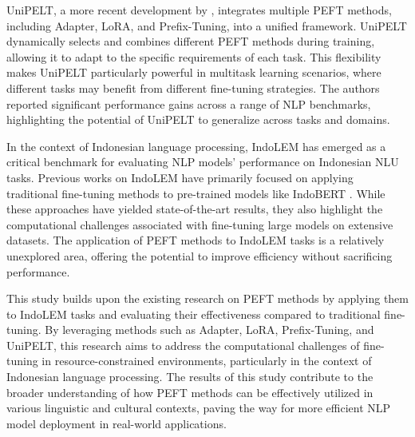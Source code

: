 UniPELT, a more recent development by \citeauthor{unipelt} \cite{unipelt}, integrates multiple PEFT methods, including Adapter, LoRA, and Prefix-Tuning, into a unified framework. UniPELT dynamically selects and combines different PEFT methods during training, allowing it to adapt to the specific requirements of each task. This flexibility makes UniPELT particularly powerful in multitask learning scenarios, where different tasks may benefit from different fine-tuning strategies. The authors reported significant performance gains across a range of NLP benchmarks, highlighting the potential of UniPELT to generalize across tasks and domains.

In the context of Indonesian language processing, IndoLEM \cite{indolem} has emerged as a critical benchmark for evaluating NLP models' performance on Indonesian NLU tasks. Previous works on IndoLEM have primarily focused on applying traditional fine-tuning methods to pre-trained models like IndoBERT \cite{indolem}. While these approaches have yielded state-of-the-art results, they also highlight the computational challenges associated with fine-tuning large models on extensive datasets. The application of PEFT methods to IndoLEM tasks is a relatively unexplored area, offering the potential to improve efficiency without sacrificing performance.

This study builds upon the existing research on PEFT methods by applying them to IndoLEM tasks and evaluating their effectiveness compared to traditional fine-tuning. By leveraging methods such as Adapter, LoRA, Prefix-Tuning, and UniPELT, this research aims to address the computational challenges of fine-tuning in resource-constrained environments, particularly in the context of Indonesian language processing. The results of this study contribute to the broader understanding of how PEFT methods can be effectively utilized in various linguistic and cultural contexts, paving the way for more efficient NLP model deployment in real-world applications.
